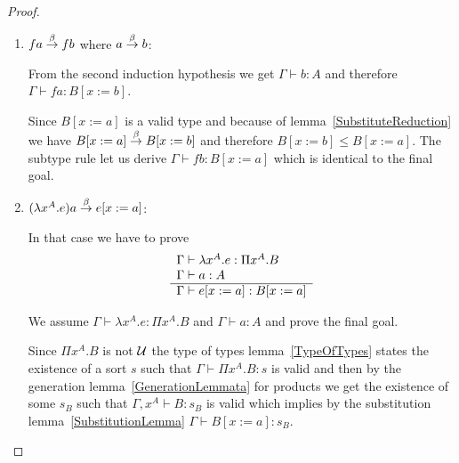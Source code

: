 \begin{theorem}
{\begin{proof}
\begin{enumerate}
\begin{enumerate}
\begin{enumerate}
\begin{enumerate}
                        \item $f a \stackrel{\beta}{\to} f b$ where $a \stackrel{\beta}{\to} b$:

                            From the second induction hypothesis we get
                            $\Gamma \vdash b: A$ and therefore $\Gamma \vdash f
                            a : B[x:=b]$.

                            Since $B[x:=a]$ is a valid type and because of
                            lemma~\ref{SubstituteReduction} we have $B[x:=a]
                            \stackrel{\beta}{\to} B[x:=b]$ and therefore $B[x:=b] \le
                            B[x:=a]$. The subtype rule let us derive
                            $\Gamma \vdash f b: B[x:=a]$ which is identical to
                            the final goal.

                        \item $(\lambda x^A. e) a \stackrel{\beta}{\to} e[x:=a]$:

                            In that case we have to prove
                            $$
                                \begin{array}{l} 
                                    \Gamma \vdash \lambda x^A. e: \Pi x^A.B
                                    \\
                                    \Gamma \vdash a: A
                                 \\ \hline 
                                    \Gamma \vdash e[x:=a]: B[x:=a]
                                \end{array}
                            $$

                            We assume $\Gamma \vdash \lambda x^A. e: \Pi x^A.B$
                            and $\Gamma \vdash a : A$ and prove the final goal.

                            Since $\Pi x^A.B$ is not ${\cal U}$ the type of types
                            lemma~\ref{TypeOfTypes} states the existence of a
                            sort $s$ such that $\Gamma \vdash \Pi x^A. B : s$ is
                            valid and then by the generation
                            lemma~\ref{GenerationLemmata} for products we get
                            the existence of some $s_B$ such that $\Gamma, x^A
                            \vdash B: s_B$ is valid which implies by the
                            substitution lemma~\ref{SubstitutionLemma} $\Gamma
                            \vdash B[x:=a]: s_B$.


\end{enumerate}
\end{enumerate}
\end{enumerate}
\end{enumerate}
\end{proof}}
\end{theorem}
